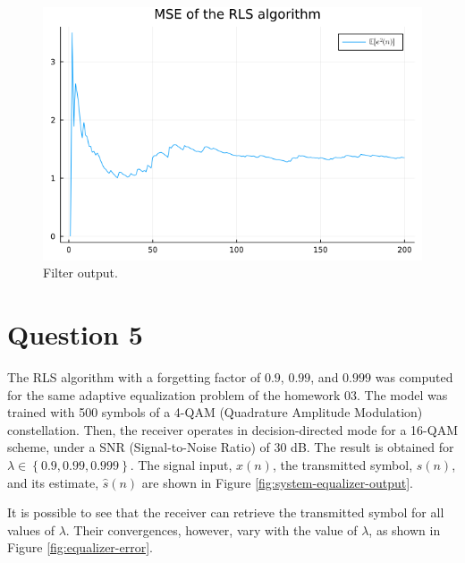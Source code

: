 \documentclass[12pt,a4paper]{article}
\begin{document}
\begin{figure}[H]
    \centering
    \includegraphics[scale=.4]{../figs/q2_rls_algorithm_error.png}
    \caption{Filter output.}
    \label{fig:mse}
\end{figure}


\section{Question 5}

The RLS algorithm with a forgetting factor of \(0.9\), \(0.99\), and \(0.999\) was computed for the same adaptive equalization problem of the homework 03. The model was trained with 500 symbols of a 4-QAM (Quadrature Amplitude Modulation) constellation. Then, the receiver operates in decision-directed mode for a 16-QAM scheme, under a SNR (Signal-to-Noise Ratio) of 30 dB. The result is obtained for \(\lambda \in \left\{ 0.9, 0.99, 0.999 \right\}\). The signal input, \(x(n)\), the transmitted symbol, \(s(n)\), and its estimate, \(\hat{s}(n)\) are shown in Figure \ref{fig:system-equalizer-output}.

It is possible to see that the receiver can retrieve the transmitted symbol for all values of \(\lambda\). Their convergences, however, vary with the value of \(\lambda\), as shown in Figure \ref{fig:equalizer-error}.
\end{document}

